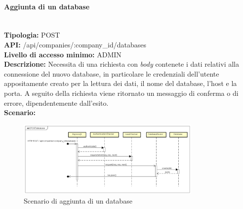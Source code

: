 \newpage
\paragraph{Aggiunta di un database}\mbox{}\\ 
\textbf{Tipologia:} POST \\
\textbf{API:} /api/companies/:company\_id/databases \\
\textbf{Livello di accesso minimo:} ADMIN \\
\textbf{Descrizione:} Necessita di una richiesta con \textit{body} contenete i dati relativi alla connessione del nuovo database, in particolare le credenziali dell'utente appositamente creato per la lettura dei dati, il nome del database, l'host e la porta. A seguito della richiesta viene ritornato un messaggio di conferma o di errore, dipendentemente dall'esito. \\
\textbf{Scenario:}
\begin{figure}[H]
\centering
\includegraphics[width=0.8\textwidth]{res/sections/backend/sequence/(POST)database.png}
\caption{Scenario di aggiunta di un database}
\end{figure}

\newpage
